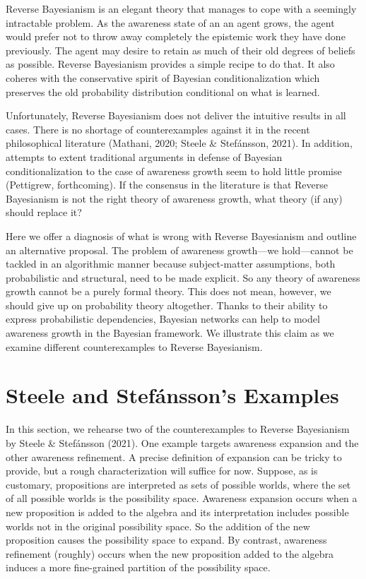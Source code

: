 \documentclass[
  11pt,
  dvipsnames,enabledeprecatedfontcommands]{scrartcl}
\begin{document}
Reverse Bayesianism is an elegant theory that manages to cope with a
seemingly intractable problem. As the awareness state of an an agent
grows, the agent would prefer not to throw away completely the epistemic
work they have done previously. The agent may desire to retain as much
of their old degrees of beliefs as possible. Reverse Bayesianism
provides a simple recipe to do that. It also coheres with the
conservative spirit of Bayesian conditionalization which preserves the
old probability distribution conditional on what is learned.

Unfortunately, Reverse Bayesianism does not deliver the intuitive
results in all cases. There is no shortage of counterexamples against it
in the recent philosophical literature (Mathani, 2020; Steele \&
Stefánsson, 2021). In addition, attempts to extent traditional arguments
in defense of Bayesian conditionalization to the case of awareness
growth seem to hold little promise (Pettigrew, forthcoming). If the
consensus in the literature is that Reverse Bayesianism is not the right
theory of awareness growth, what theory (if any) should replace it?

Here we offer a diagnosis of what is wrong with Reverse Bayesianism and
outline an alternative proposal. The problem of awareness growth---we
hold---cannot be tackled in an algorithmic manner because subject-matter
assumptions, both probabilistic and structural, need to be made
explicit. So any theory of awareness growth cannot be a purely formal
theory. This does not mean, however, we should give up on probability
theory altogether. Thanks to their ability to express probabilistic
dependencies, Bayesian networks can help to model awareness growth in
the Bayesian framework. We illustrate this claim as we examine different
counterexamples to Reverse Bayesianism.

\hypertarget{steele-and-stefuxe1nssons-examples}{%
\section{Steele and Stefánsson's
Examples}\label{steele-and-stefuxe1nssons-examples}}

\label{sec:counterexamples}

In this section, we rehearse two of the counterexamples to Reverse
Bayesianism by Steele \& Stefánsson (2021). One example targets
awareness expansion and the other awareness refinement. A precise
definition of expansion can be tricky to provide, but a rough
characterization will suffice for now. Suppose, as is customary,
propositions are interpreted as sets of possible worlds, where the set
of all possible worlds is the possibility space. Awareness expansion
occurs when a new proposition is added to the algebra and its
interpretation includes possible worlds not in the original possibility
space. So the addition of the new proposition causes the possibility
space to expand. By contrast, awareness refinement (roughly) occurs when
the new proposition added to the algebra induces a more fine-grained
partition of the possibility space.
\end{document}
